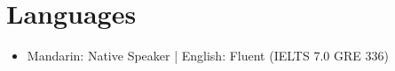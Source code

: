 \section{Languages}
  \begin{itemize}[leftmargin=*]
    \item\small{Mandarin: Native Speaker | English: Fluent (IELTS 7.0 GRE 336)}
  \end{itemize}